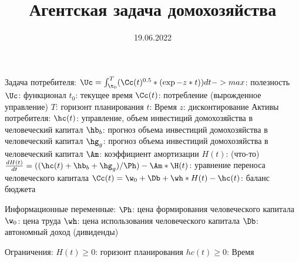\documentclass[12pt]{article}
\title{Агентская задача домохозяйства}
\date{19.06.2022}
\begin{document}
Задача потребителя:
    $\Uc = \int_{\t_{0}}^T (\Cc(t)^{0.5}*(\exp{-z*t}))dt -> max$: полезность
    $\Uc$: функционал
    $t_{0}$: текущее время
    $\Cc(t)$: потребление (вырожденное управление)
    $T$: горизонт планирования
    $t$: Время
    $z$: дисконтирование
Активы потребителя:
    $\hc(t)$: управление, объем инвестиций домохозяйства в человеческий капитал
    $\hb_{b}$: прогноз объема инвестиций домохозяйства в человеческий капитал
    $\hg_{g}$: прогноз объема инвестиций домохозяйства в человеческий капитал
    $\Am$: коэффициент амортизации
    $H(t)$: (что-то)
    $\frac{dH(t)}{dt} = ((\hc(t)+\hb_{b}+\hg_{g})/\Ph)-\Am*\H(t)$: уравнение переноса человеческого капитала
    $\Cc(t) = \w_{0}+\Db+\wh*H(t)-\hc(t)$: баланс бюджета

Информационные переменные:
    $\Ph$: цена формирования человеческого капитала
    $\w_{0}$: цена труда
    $\wh$: цена использования человеческого капитала
    $\Db$: автономный доход (дивиденды)

Ограничения:
    $H(t)\geq 0$: горизонт планирования
    $hc(t)\geq 0$: Время
\end{document}
